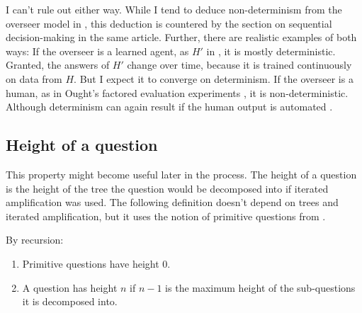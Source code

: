 \documentclass{farlamp}
\begin{document}
I can't rule out either way. While I tend to deduce non-determinism from the
overseer model in \textcite{ChriRelAmp}, this deduction is countered by the
section on sequential decision-making in the same article. Further, there are
realistic examples of both ways: If the overseer is a learned agent, as $H'$ in
\textcite{CSASupAmp}, it is mostly deterministic. Granted, the answers of $H'$
change over time, because it is trained continuously on data from $H$. But I
expect it to converge on determinism. If the overseer is a human, as in Ought's
factored evaluation experiments \parencite{StuhDelCog}, it is non-deterministic.
Although determinism can again result if the human output is automated
\parencite[see][sec. ‘Caching’ f.]{StuhTaxCapAmp}.

%
%
%
%


\subsection{Height of a question}

This property might become useful later in the process. The height of a
question is the height of the tree the question would be decomposed into if
iterated amplification was used. The following definition doesn't depend on
trees and iterated amplification, but it uses the notion of primitive questions
from \textcite[app. C]{CSASupAmp}.

\begin{definition} By recursion:
    \begin{enumerate}
    \item Primitive questions have height 0.
    \item A question has height $n$ if $n-1$ is the maximum height of the
        sub-questions it is decomposed into.
    \end{enumerate}
\end{definition}
\end{document}
